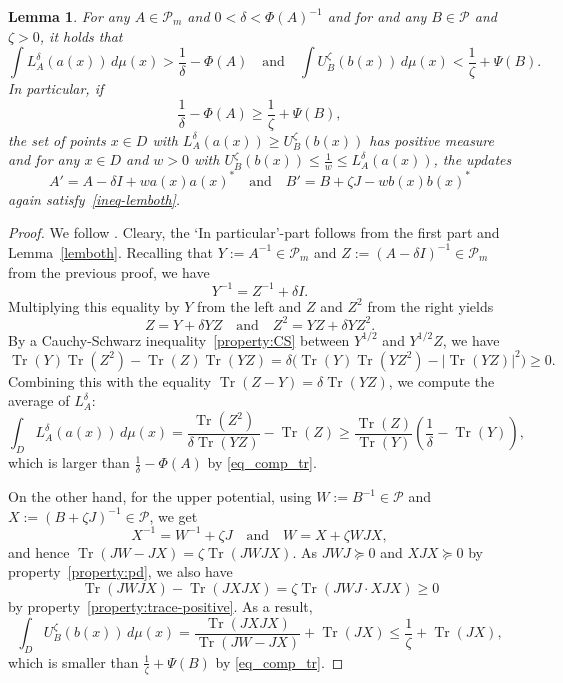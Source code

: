 \documentclass[a4paper,11pt]{article}
\renewcommand{\(}{\left (}
\renewcommand{\)}{\right )}
\newcommand{\<}{\langle}
\renewcommand{\>}{\rangle}
\newtheorem{lemma}[theorem]{Lemma}
\theoremstyle{definition}
\DeclareMathOperator{\Tr}{Tr}
\begin{document}
\begin{lemma} \label{lemma:pos_measure}
For any $A\in \mathcal P_m$ and $0<\delta<\Phi(A)^{-1}$ and
for and any $B\in \mathcal P$ and $\zeta>0$,
it holds that
\[
\int L_A^\delta(a(x))\, d\mu(x) >  \frac{1}{\delta}-\Phi(A)
\quad\text{and}\quad
\int U_B^\zeta(b(x))\, d\mu(x) < \frac{1}{\zeta}+\Psi(B).
\]
In particular, if
\begin{equation}
\label{ineq-lemboth}
\frac{1}{\delta}-\Phi(A)\geq \frac{1}{\zeta}+\Psi(B),
\end{equation}
the set of points $x\in D$ with  
$L_A^\delta(a(x)) \ge U_B^\zeta(b(x))$ has positive measure
and
for any $x \in D$ and $w>0$ with $U_B^\zeta(b(x)) \le \frac1w \le L_A^\delta(a(x))$, the updates
\begin{equation}\label{eq:updates}
A'=A-\delta I+wa(x)a(x)^*\quad\text{and}\quad B'=B+\zeta J-wb(x)b(x)^*
\end{equation}
again satisfy~\eqref{ineq-lemboth}.
\end{lemma}

\begin{proof}
We follow \cite[Lemma 3.5]{BSS}.
Cleary, the `In particular'-part follows from the first part and Lemma~\ref{lemboth}.
Recalling that $Y:=A^{-1}\in \mathcal P_m$ 
and $Z:=(A- \delta I)^{-1}\in \mathcal P_m$ from the previous proof, we have
\[
Y^{-1}=Z^{-1}+\delta I.
\]
Multiplying this equality by $Y$ from the left and $Z$ and $Z^2$ from the right
yields
\[
Z=Y+\delta YZ\quad\text{and}\quad Z^2=YZ+\delta YZ^2.
\]
By a Cauchy-Schwarz inequality~\eqref{property:CS} between $Y^{1/2}$ and $Y^{1/2}Z$,
we have
\[
\Tr(Y)\Tr(Z^2)-\Tr(Z)\Tr(YZ)=\delta\Big(\Tr(Y)\Tr(YZ^2)- |\Tr(YZ)|^2\Big) \geq 0.
\]
Combining this with the equality $\Tr(Z-Y)=\delta\Tr(YZ)$, we compute the average of $L_A^\delta$:
\begin{equation}\label{eq:exp-LA}
\int_D L_A^\delta(a(x))\,d\mu(x)
=\frac{\Tr(Z^2)}{\delta\Tr(YZ)}-\Tr(Z)
\geq \frac{\Tr(Z)}{\Tr(Y)}\left(\frac{1}{\delta}-\Tr(Y)\right),
\end{equation}
which is larger than $\frac{1}{\delta}-\Phi(A)$ by \eqref{eq_comp_tr}.

On the other hand, for the upper potential, using $W:=B^{-1}\in \mathcal P$
and $X:=(B+\zeta J)^{-1}\in \mathcal P$, we get
\[
X^{-1}=W^{-1}+\zeta J\quad\text{and}\quad W=X+\zeta WJX,
\]
and hence $\Tr(JW-JX)=\zeta \Tr(JWJX)$. As $JWJ\succcurlyeq 0$ and $XJX\succcurlyeq 0$ by property~\eqref{property:pd}, we also have
\[
 \Tr(JWJX) - \Tr(JXJX)
 = \zeta  \Tr(JWJ \cdot XJX) \geq 0
\]
by property~\eqref{property:trace-positive}.
As a result,
\begin{equation}\label{eq:exp-UB}
\int_D U_B^\zeta(b(x))\,d\mu(x)=\frac{\Tr(JXJX)}{\Tr(JW-JX)}+\Tr(JX)
\leq \frac{1}{\zeta}+\Tr(JX),
\end{equation}
which is smaller than $\frac{1}{\zeta}+\Psi(B)$ by \eqref{eq_comp_tr}.
\end{proof}
\end{document}
